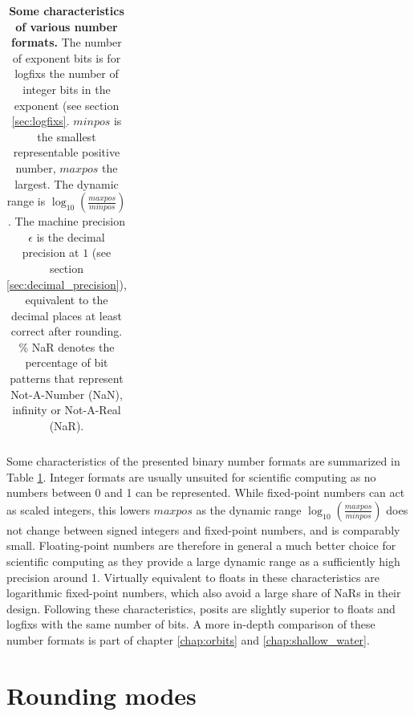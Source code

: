 \begin{table}[htbp]
\begin{tabular}{l | r | r | l | l | r | r | r}
        \end{tabular}
        \vspace{10pt}
	\caption{\textbf{Some characteristics of various number formats.} The number of exponent bits is for logfixs the number of
	integer bits in the exponent (see section \ref{sec:logfixs}. $minpos$ is the smallest representable positive number,
	$maxpos$ the largest. The dynamic range is $\log_{10}(\tfrac{maxpos}{minpos})$. The machine precision $\epsilon$ is the decimal
	precision at $1$ (see section \ref{sec:decimal_precision}), equivalent to the decimal places at least correct after rounding.
	\% NaR denotes the percentage of bit patterns that represent Not-A-Number (NaN), infinity or Not-A-Real (NaR).}
	\label{tab:formats}
\end{table}

Some characteristics of the presented binary number formats are summarized in Table \ref{tab:formats}. Integer formats are usually
unsuited for scientific computing as no numbers between 0 and 1 can be represented. While fixed-point numbers can act as
scaled integers, this lowers $maxpos$ as the dynamic range $\log_{10}(\tfrac{maxpos}{minpos})$ does not change between signed
integers and fixed-point numbers, and is comparably small. Floating-point numbers are therefore in general a much better
choice for scientific computing as they provide a large dynamic range as a sufficiently high precision around 1. Virtually equivalent
to floats in these characteristics are logarithmic fixed-point numbers, which also avoid a large share of NaRs in their design.
Following these characteristics, posits are slightly superior to floats and logfixs with the same number of bits. A more in-depth
comparison of these number formats is part of chapter \ref{chap:orbits} and \ref{chap:shallow_water}.

\section{Rounding modes}
\label{sec:rounding}


